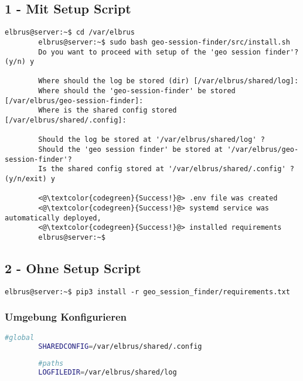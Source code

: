 	\subsection{1 - Mit Setup Script}
	
	\lstset{style=commands}
	\begin{lstlisting}[caption={Ausführen des 'install.sh' Scripts.}]
		elbrus@server:~$ cd /var/elbrus
		elbrus@server:~$ sudo bash geo-session-finder/src/install.sh
		Do you want to proceed with setup of the 'geo session finder'? (y/n) y
		
		Where should the log be stored (dir) [/var/elbrus/shared/log]:
		Where should the 'geo-session-finder' be stored [/var/elbrus/geo-session-finder]:
		Where is the shared config stored [/var/elbrus/shared/.config]:
		
		Should the log be stored at '/var/elbrus/shared/log' ?
		Should the 'geo session finder' be stored at '/var/elbrus/geo-session-finder'?
		Is the shared config stored at '/var/elbrus/shared/.config' ? (y/n/exit) y
		
		<@\textcolor{codegreen}{Success!}@> .env file was created
		<@\textcolor{codegreen}{Success!}@> systemd service was automatically deployed,
		<@\textcolor{codegreen}{Success!}@> installed requirements
		elbrus@server:~$	
	\end{lstlisting}

	\subsection{2 - Ohne Setup Script}

	\lstset{style=commands}
	\begin{lstlisting}[caption={Installieren der Abhängigkeiten.}]
		elbrus@server:~$ pip3 install -r geo_session_finder/requirements.txt
	\end{lstlisting}

	\subsubsection[file config]{Umgebung Konfigurieren}
	\lstset{style=files}
	\begin{lstlisting}[caption={Anhand von '.env.example' eigene '.env' Datei anlegen.}, language=bash]
		#global
		SHAREDCONFIG=/var/elbrus/shared/.config
		
		#paths
		LOGFILEDIR=/var/elbrus/shared/log
	\end{lstlisting}
	\newpage
	
